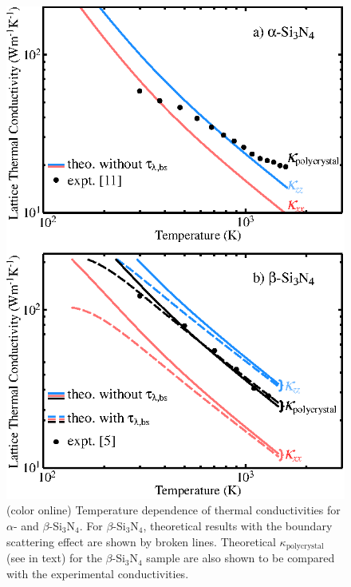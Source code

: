 \documentclass[twocolumn,amsmath,amssymb,a4paper,prb,superscriptaddress,floatfix]{revtex4-1}
\begin{document}
\begin{figure}[ht]
 \begin{center}
  \includegraphics[width=0.90\linewidth]{Fig1_m1010.eps} \caption{(color
  online) Temperature dependence of thermal conductivities for $\alpha$- and
  $\beta$-Si$_3$N$_4$. For $\beta$-Si$_3$N$_4$, theoretical results with the
  boundary scattering effect are shown by broken lines. Theoretical
  $\kappa_\mathrm{polycrystal}$ 
  (see in text) for the $\beta$-Si$_3$N$_4$ sample are
  also shown to be compared with the experimental conductivities.}
  \label{fig:Fig1_338}
 \end{center}
\end{figure}
\end{document}
